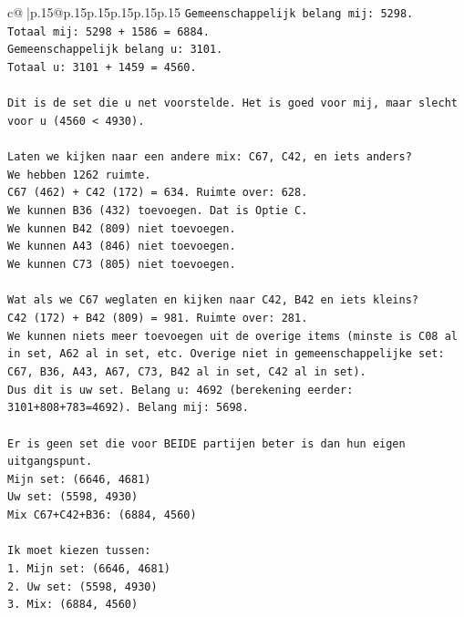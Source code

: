 \documentclass{article}
\begin{document}
{\begin{supertabular}{c@{$\;$}|p{.15\linewidth}@{}p{.15\linewidth}p{.15\linewidth}p{.15\linewidth}p{.15\linewidth}p{.15\linewidth}}
{{{\texttt{Gemeenschappelijk belang mij: 5298.} \\
\texttt{Totaal mij: 5298 + 1586 = 6884.} \\
\texttt{Gemeenschappelijk belang u: 3101.} \\
\texttt{Totaal u: 3101 + 1459 = 4560.} \\
\\ 
\texttt{Dit is de set die u net voorstelde. Het is goed voor mij, maar slecht voor u (4560 < 4930).} \\
\\ 
\texttt{Laten we kijken naar een andere mix: C67, C42, en iets anders?} \\
\texttt{We hebben 1262 ruimte.} \\
\texttt{C67 (462) + C42 (172) = 634. Ruimte over: 628.} \\
\texttt{We kunnen B36 (432) toevoegen. Dat is Optie C.} \\
\texttt{We kunnen B42 (809) niet toevoegen.} \\
\texttt{We kunnen A43 (846) niet toevoegen.} \\
\texttt{We kunnen C73 (805) niet toevoegen.} \\
\\ 
\texttt{Wat als we C67 weglaten en kijken naar C42, B42 en iets kleins?} \\
\texttt{C42 (172) + B42 (809) = 981. Ruimte over: 281.} \\
\texttt{We kunnen niets meer toevoegen uit de overige items (minste is C08 al in set, A62 al in set, etc. Overige niet in gemeenschappelijke set: C67, B36, A43, A67, C73, B42 al in set, C42 al in set).} \\
\texttt{Dus dit is uw set. Belang u: 4692 (berekening eerder: 3101+808+783=4692). Belang mij: 5698.} \\
\\ 
\texttt{Er is geen set die voor BEIDE partijen beter is dan hun eigen uitgangspunt.} \\
\texttt{Mijn set: (6646, 4681)} \\
\texttt{Uw set: (5598, 4930)} \\
\texttt{Mix C67+C42+B36: (6884, 4560)} \\
\\ 
\texttt{Ik moet kiezen tussen:} \\
\texttt{1. Mijn set: (6646, 4681)} \\
\texttt{2. Uw set: (5598, 4930)} \\
\texttt{3. Mix: (6884, 4560)} \\
}}}
\end{supertabular}}
\end{document}
